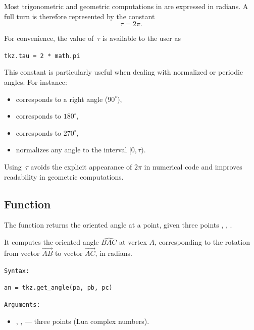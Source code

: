 Most trigonometric and geometric computations in 
are expressed in radians.  A full turn is therefore represented by the
constant
\[
\tau = 2\pi.
\]

For convenience, the value of~$\tau$ is available to the user as


\verb|tkz.tau = 2 * math.pi|


This constant is particularly useful when dealing with normalized or
periodic angles.  For instance:

\begin{itemize}
  \item {} corresponds to a right angle ($90^\circ$),
  \item {} corresponds to $180^\circ$,
  \item {} corresponds to $270^\circ$,
  \item {} normalizes any angle  to the interval $[0,\tau)$.
\end{itemize}

Using~$\tau$ avoids the explicit appearance of $2\pi$ in numerical code
and improves readability in geometric computations.


\subsection{Function }
\label{sub:tkz.get_angle}

The function  returns the oriented angle at a point,
given three points , , .

It computes the oriented angle $\widehat{BAC}$ at vertex $A$, corresponding to the
rotation from vector $\overrightarrow{AB}$ to vector $\overrightarrow{AC}$, in radians.

\medskip
\texttt{Syntax: }

\begin{mybox}
\verb|an = tkz.get_angle(pa, pb, pc)|
\end{mybox}


\texttt{Arguments: }
\begin{itemize}
  \item {}, ,  — three points (Lua complex numbers).
\end{itemize}


